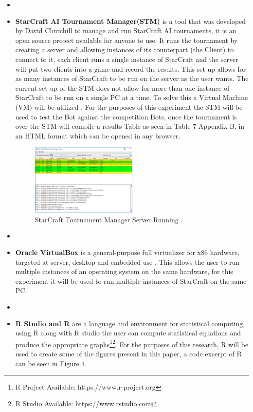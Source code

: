 \documentclass[journal]{IEEEtran}
\begin{document}
\begin{itemize}
		\item[]
		\item \textbf{StarCraft AI Tournament Manager(STM)} is a tool that was developed by David Churchill to manage and run StarCraft AI tournaments, it is an open source project available for anyone to use. It runs the tournament by creating a server and allowing instances of its counterpart (the Client) to connect to it, each client runs a single instance of StarCraft and the server will put two clients into a game and record the results. This set-up allows for as many instances of StarCraft to be run on the server as the user wants. The current set-up of the STM does not allow for more than one instance of StarCraft to be run on a single PC at a time. To solve this a Virtual Machine (VM) will be utilized \cite{Tournament}. For the purposes of this experiment the STM will be used to test the Bot against the competition Bots, once the tournament is over the STM will compile a results Table as seen in Table 7 Appendix B, in an HTML format which can be opened in any browser.
		\begin{figure}
			\centering
			\includegraphics[width=0.5\textwidth]{TMPic}
			\caption{StarCraft Tournament Manager Server Running \cite{Tournament}.}
			\label{Fig2}
		\end{figure}
		\item[]
		\item \textbf{Oracle VirtualBox} is a general-purpose full virtualizer for x86 hardware, targeted at server, desktop and embedded use \cite{Virtual}. This allows the user to run multiple instances of an operating system on the same hardware, for this experiment it will be used to run multiple instances of StarCraft on the same PC. 
		\item[]
		\item \textbf{R Studio and R} are a language and environment for statistical computing, using R along with R studio the user can compute statistical equations and produce the appropriate graphs\footnote[1]{R Project Available: https://www.r-project.org}\footnote[2]{R Studio Available: https://www.rstudio.com}. For the purposes of this research, R will be used to create some of the figures present in this paper, a code excerpt of R can be seen in Figure 4. 
		\newline
	\end{itemize}
	
\end{document}
